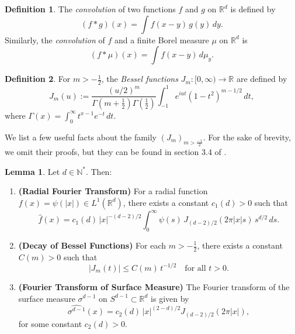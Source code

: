 \documentclass[12pt,a4paper]{report}
\theoremstyle{definition}
\newtheorem{lemma}{Lemma}
\newtheorem{definition}{Definition}
\begin{document}
\begin{definition}
The \emph{convolution} of two functions \( f \) and \( g \) on $\mathbb{R}^d$ is defined by
\[
(f * g)(x) = \int f(x - y)\, g(y) \, dy.
\]
Similarly, the \emph{convolution} of $f$ and a finite Borel measure $\mu$ on  $\mathbb{R}^d$ is
\[
(f * \mu)(x) = \int f(x - y) \, d\mu_y.
\]
\end{definition}

\begin{definition}
For \( m > -\frac{1}{2} \), the \textit{Bessel functions} \( J_m : [0, \infty) \to \mathbb{R} \) are defined by
\[
J_m(u) := \frac{(u/2)^m}{\Gamma(m + \frac{1}{2}) \Gamma(\frac{1}{2})} \int_{-1}^1 e^{iut}(1 - t^2)^{m - 1/2} \, dt,
\]
where \( \Gamma(x) = \int_0^\infty t^{x - 1} e^{-t} \, dt.\)
\end{definition}

We list a few useful facts about the family $(J_m)_{m>\frac{-1}{2}}$. For the sake of brevity, we omit their proofs, but they can be found in section 3.4 of \cite{mattila2015fourier}.

\begin{lemma}\label{lemma:bessel-fourier}
Let \( d \in \mathbb{N}^* \). Then:
\begin{enumerate}[label=(\alph*)]
    \item \textbf{(Radial Fourier Transform)}
    For a radial function \( f(x) = \psi(|x|) \in L^1(\mathbb{R}^d) \), there exists a constant \( c_1(d) > 0 \) such that
    \begin{equation}\label{eq:FTBessel}
    \widehat{f}(x) = c_1(d)\, |x|^{-(d-2)/2} \int_0^\infty \psi(s)\, J_{(d-2)/2}(2\pi |x| s)\, s^{d/2} \, ds.
    \end{equation}

    \item \textbf{(Decay of Bessel Functions)}
    For each \( m > -\frac{1}{2} \), there exists a constant \( C(m) > 0 \) such that
    \begin{equation}\label{eq:bessel-decay}
    |J_m(t)| \leq C(m)\, t^{-1/2} \quad \text{for all } t > 0.
    \end{equation}

    \item \textbf{(Fourier Transform of Surface Measure)}
    The Fourier transform of the surface measure \( \sigma^{d-1} \) on \( S^{d-1} \subset \mathbb{R}^d \) is given by
    \begin{equation}\label{eq:sphere-fourier}
    \widehat{\sigma^{d-1}}(x) = c_2(d)\, |x|^{(2 - d)/2} J_{(d-2)/2}(2\pi |x|),
    \end{equation}
    for some constant \( c_2(d) > 0 \).
\end{enumerate}
\end{lemma}
\end{document}

